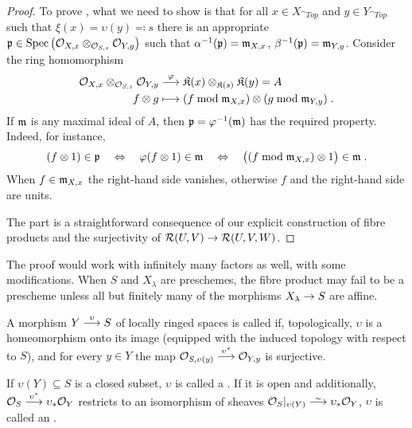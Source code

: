 \documentclass[a4paper,parskip=half,numbers=enddot, DIV=12]{scrreprt}
\begin{document}
\begin{proof}
    To prove , what we need to show is that for all $x\in X_{\cat{Top}}$ and $y\in Y_{\cat{Top}}$ such that $\xi(x) = \upsilon(y)\eqqcolon s$ there is an appropriate $\mathfrak{p}\in \operatorname{Spec}\left(\mathcal{O}_{X,x} \otimes_{\mathcal{O}_{S,s}}\mathcal{O}_{Y,y}\right)$ such that $\alpha^{-1}(\mathfrak{p}) = \mathfrak{m}_{X,x}$, $\beta^{-1}(\mathfrak{p}) = \mathfrak{m}_{Y,y}$. Consider the ring homomorphism
    \begin{align*}
        \Oo_{X,x}\otimes_{\Oo_{S,s}} \Oo_{Y,y} &\morphism[\phi] \KK(x) \otimes_{\KK(s)}\KK(y) = A\\
        f\otimes g &\longmapsto (f\bmod \mm_{X,x}) \otimes (g\bmod \mm_{Y,y})\;.
    \end{align*}
    If $\mathfrak{m}$ is any maximal ideal of $A$, then $\mathfrak{p} = \varphi^{-1}(\mathfrak{m})$ has the required property. Indeed, for instance,
    \begin{align*}
        (f\otimes 1)\in\mathfrak{p} \quad\Leftrightarrow\quad \varphi(f\otimes 1)\in \mathfrak{m} \quad\Leftrightarrow\quad \big((f\bmod\mathfrak{m}_{X,x})\otimes 1\big) \in\mathfrak{m}\;.
    \end{align*}
    When $f\in \mathfrak{m}_{X,x}$ the right-hand side vanishes, otherwise $f$ and the right-hand side are units.
    
    The part  is a straightforward consequence of our explicit construction of fibre products and the surjectivity of $\Rr(U,V) \morphism \Rr(U,V,W)$.
\end{proof}

\begin{rem}
    The proof would work with infinitely many factors as well, with some modifications. When $S$ and $X_\lambda$ are preschemes, the fibre product may fail to be a prescheme unless all but finitely many of the morphisms $X_\lambda \morphism S$ are affine.
\end{rem}

\begin{defi} 
    A morphism $Y\morphism[\upsilon] S$ of locally ringed spaces is called  if, topologically, $\upsilon$ is a homeomorphism onto its image (equipped with the induced topology with respect to $S$), and for every $y\in Y$ the map $\Oo_{S,\upsilon(y)} \morphism[\upsilon^*]\Oo_{Y,y}$ is surjective. 
       
    If $\upsilon(Y)\subseteq S$ is a closed subset, $\upsilon$ is called a . If it is open and additionally, $\Oo_S\morphism[\upsilon^*]\upsilon_*\Oo_Y$ restricts to an isomorphism of sheaves $\Oo_S|_{\upsilon(Y)}\isomorphism\upsilon_*\Oo_Y$, $\upsilon$ is called an .
\end{defi}
\end{document}
